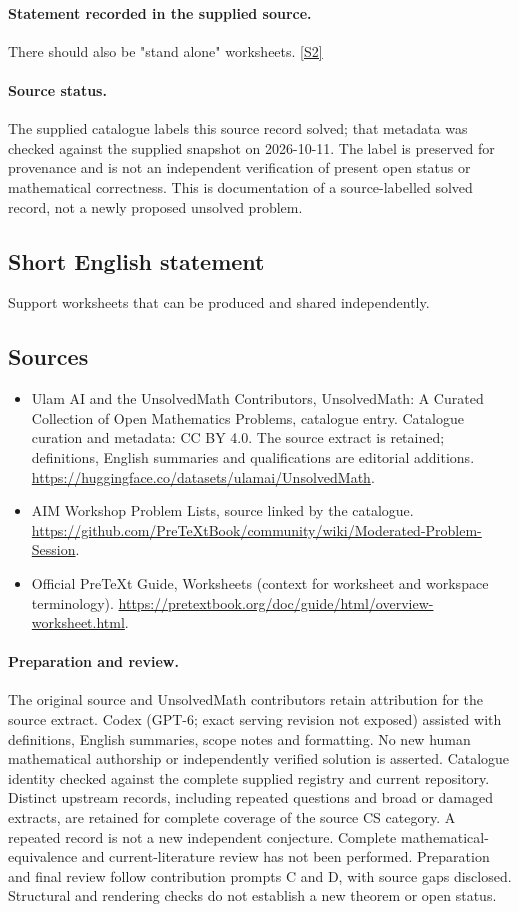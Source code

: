 \documentclass[11pt]{article}
\begin{document}
\paragraph{Statement recorded in the supplied source.}
There should also be "stand alone" worksheets. \href{https://github.com/PreTeXtBook/community/wiki/Moderated-Problem-Session}{[S2]}
\paragraph{Source status.}
The supplied catalogue labels this source record solved; that metadata was checked against the supplied snapshot on 2026-10-11. The label is preserved for provenance and is not an independent verification of present open status or mathematical correctness. This is documentation of a source-labelled solved record, not a newly proposed unsolved problem.
\subsection{Short English statement}
Support worksheets that can be produced and shared independently.
\subsection{Sources}
\begin{itemize}
\item[S1] Ulam AI and the UnsolvedMath Contributors, UnsolvedMath: A Curated Collection of Open Mathematics Problems, catalogue entry. Catalogue curation and metadata: CC BY 4.0. The source extract is retained; definitions, English summaries and qualifications are editorial additions.
\url{https://huggingface.co/datasets/ulamai/UnsolvedMath}.
\item[S2] AIM Workshop Problem Lists, source linked by the catalogue.
\url{https://github.com/PreTeXtBook/community/wiki/Moderated-Problem-Session}.
\item[S3] Official PreTeXt Guide, Worksheets (context for worksheet and workspace terminology).
\url{https://pretextbook.org/doc/guide/html/overview-worksheet.html}.
\end{itemize}
\paragraph{Preparation and review.}
The original source and UnsolvedMath contributors retain attribution for the source extract. Codex (GPT-6; exact serving revision not exposed) assisted with definitions, English summaries, scope notes and formatting. No new human mathematical authorship or independently verified solution is asserted. Catalogue identity checked against the complete supplied registry and current repository. Distinct upstream records, including repeated questions and broad or damaged extracts, are retained for complete coverage of the source CS category. A repeated record is not a new independent conjecture. Complete mathematical-equivalence and current-literature review has not been performed. Preparation and final review follow contribution prompts C and D, with source gaps disclosed. Structural and rendering checks do not establish a new theorem or open status.
\label{end:statement}
\end{document}

